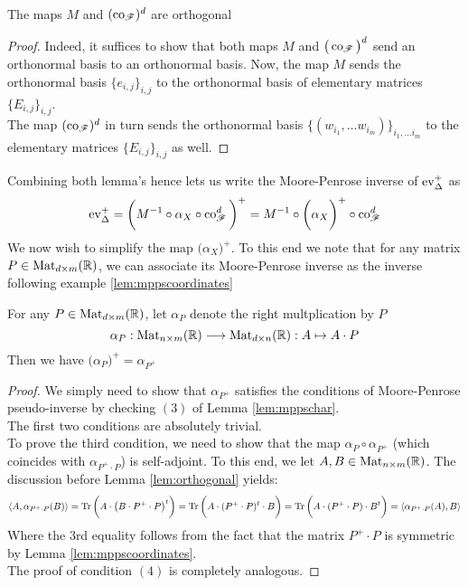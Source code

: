 \begin{lemma}\label{lem:orthogonal}
	The maps $M$ and $(\co_{\r{F}})^d$ are orthogonal
\end{lemma}

\begin{proof}
	Indeed, it suffices to show that both maps $M$ and $\big(\co_{\r{F}}\big)^d$ send an orthonormal basis to an orthonormal basis. Now, the map $M$ sends the orthonormal basis $\big\{e_{i,j}\big\}_{i,j}$ to the orthonormal basis of elementary matrices $\big\{ E_{i,j}\big\}_{i,j}$.\\
	The map $(\co_{\r{F}})^d$ in turn sends the orthonormal basis $\big\{(w_{i_1},\ldots w_{i_m})\big\}_{i_1,\ldots i_m}$ to the elementary matrices $\big\{E_{i,j}\big\}_{i,j}$ as well.
\end{proof}

Combining both lemma's hence lets us write the Moore-Penrose inverse of $\operatorname{ev}_\Delta^+$ as
\[
\ev_\Delta^+ =\bigg( M^{-1} \circ \alpha_X\circ\co_{\r{F}}^d\bigg)^+= M^{-1}\circ \bigg( \alpha_X \bigg)^+\circ\co_{\r{F}}^d
\]
We now wish to simplify the map $\bigg(\alpha_X\bigg)^+$. To this end we note that for any matrix $P \in \operatorname{Mat}_{d\times m }(\mathbb{R})$, we can associate its Moore-Penrose inverse as the inverse following example \ref{lem:mppscoordinates}
\begin{lemma}
	For any $P \in \operatorname{Mat}_{d\times m}(\mathbb{R})$, let $\alpha_P$ denote the right multplication by $P$
	\[
	\alpha_P:\operatorname{Mat}_{n\times m}(\mathbb{R})\longrightarrow \operatorname{Mat}_{d\times n}(\mathbb{R}):A\mapsto A\cdot P
	\]
	 Then we have $\big( \alpha_P\big)^+ = \alpha_{P^+}$
\end{lemma}

\begin{proof}
We simply need to show that $\alpha_{P^+}$ satisfies the conditions of Moore-Penrose pseudo-inverse by checking $(3)$ of Lemma \ref{lem:mppschar}.\\
The first two conditions are absolutely trivial.\\ 
To prove the third condition, we need to show that the map $\alpha_{P}\circ \alpha_{P^+}$ (which coincides with $\alpha_{P^+\cdot P}$) is self-adjoint. To this end, we let $A,B \in \operatorname{Mat}_{n\times m}(\mathbb{R})$. The discussion before Lemma \ref{lem:orthogonal} yields:
\[
\left\langle A,\alpha_{P^+\cdot P}(B)\right\rangle=\operatorname{Tr}\bigg(A\cdot \big(B\cdot P^+\cdot P\big)^t\bigg)=\operatorname{Tr}\bigg(A \cdot (P^+\cdot P)^t\cdot B\bigg) = \operatorname{Tr}\bigg(A \cdot (P^+\cdot P)\cdot B^t\bigg)=\left\langle \alpha_{P^+\cdot P}(A),B\right\rangle
\]
Where the $3$rd equality follows from the fact that the matrix $P^+\cdot P$ is symmetric by Lemma \ref{lem:mppscoordinates}.\\
The proof of condition $(4)$ is completely analogous.
\end{proof}

